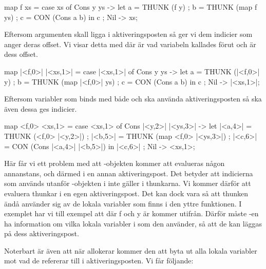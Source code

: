 \documentclass[../Core]{subfiles}
\begin{document}

\begin{codeEx}
map f xs = case xs of
    { Cons y ys -> let
        { a = THUNK (f y)
        ; b = THUNK (map f ys)
        ; c = CON (Cons a b)
        } in c
    ; Nil -> xs};
\end{codeEx}

Eftersom argumenten skall ligga i aktiveringsposten så ger vi dem indicier som anger deras 
offset. Vi visar detta med  där  är vad variabeln kallades 
förut och  är dess offset.

\begin{codeExDiff}
map |<f,0>| |<xs,1>| = case |<xs,1>| of
    { Cons y ys -> let
        { a = THUNK (|<f,0>| y)
        ; b = THUNK (map |<f,0>| ys)
        ; c = CON (Cons a b)
        } in c
    ; Nil -> |<xs,1>|};
\end{codeExDiff}


Eftersom variabler som binds med både  och  
ska använda aktiveringsposten så ska även dessa ges indicier.

\begin{codeExDiff}
map <f,0> <xs,1> = case <xs,1> of
    { Cons |<y,2>| |<ys,3>| -> let
        { |<a,4>| = THUNK (<f,0> |<y,2>|)
        ; |<b,5>| = THUNK (map <f,0> |<ys,3>|)
        ; |<c,6>| = CON (Cons |<a,4>| |<b,5>|)
        } in |<c,6>|
    ; Nil -> <xs,1>};
\end{codeExDiff}

Här får vi ett problem med att -objekten kommer att evalueras någon 
annanstans, och därmed i en annan aktiveringspost. Det betyder att indicierna som 
används utanför -objekten i  inte gäller i thunkarna. Vi kommer därför att evaluera
thunkar i en egen aktiveringspost. Det kan dock vara så att thunken ändå använder sig
av de lokala variabler som finns i den yttre funktionen. I exemplet har vi till exempel att 
 där f och y är kommer utifrån. Därför 
måste -en ha information om vilka lokala variabler i  
som den använder, så att de kan läggas på dess aktiveringspost. 

Noterbart är även att när  allokerar kommer den att byta ut alla lokala variabler
mot vad de refererar till i aktiveringsposten. Vi får följande: 

\end{document}
